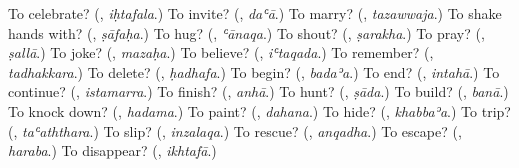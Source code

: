 \begin{tcolorbox}[breakable,colback=teal!4,colframe=teal!35!black,title={Before you move on}]
To celebrate? (\textbf{}, \emph{iḥtafala}.) To invite? (\textbf{}, \emph{daʿā}.) To marry? (\textbf{}, \emph{tazawwaja}.) To shake hands with? (\textbf{}, \emph{ṣāfaḥa}.) To hug? (\textbf{}, \emph{ʿānaqa}.) To shout? (\textbf{}, \emph{ṣarakha}.) To pray? (\textbf{}, \emph{ṣallā}.) To joke? (\textbf{}, \emph{mazaḥa}.) To believe? (\textbf{}, \emph{iʿtaqada}.) To remember? (\textbf{}, \emph{tadhakkara}.) To delete? (\textbf{}, \emph{ḥadhafa}.) To begin? (\textbf{}, \emph{badaʾa}.) To end? (\textbf{}, \emph{intahā}.) To continue? (\textbf{}, \emph{istamarra}.) To finish? (\textbf{}, \emph{anhā}.) To hunt? (\textbf{}, \emph{ṣāda}.) To build? (\textbf{}, \emph{banā}.) To knock down? (\textbf{}, \emph{hadama}.) To paint? (\textbf{}, \emph{dahana}.) To hide? (\textbf{}, \emph{khabbaʾa}.) To trip? (\textbf{}, \emph{taʿaththara}.) To slip? (\textbf{}, \emph{inzalaqa}.) To rescue? (\textbf{}, \emph{anqadha}.) To escape? (\textbf{}, \emph{haraba}.) To disappear? (\textbf{}, \emph{ikhtafā}.)
\end{tcolorbox}
